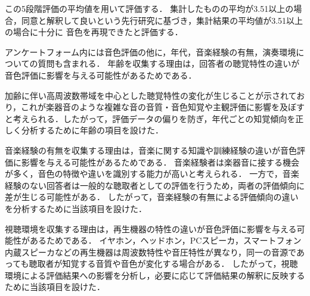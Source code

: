 \documentclass[lualatex,book,openany,paper=a4paper,jafontsize=11.5pt,jafontscale=1.05]{jlreq}
\begin{document}
この5段階評価の平均値を用いて評価する．
集計したものの平均が3.51以上の場合，同意と解釈して良いという先行研究\cite{アンケート}に基づき，集計結果の平均値が3.51以上の場合に十分に
音色を再現できたと評価する．

アンケートフォーム内には音色評価の他に，年代，音楽経験の有無，演奏環境についての質問も含まれる．
年齢を収集する理由は，回答者の聴覚特性の違いが音色評価に影響を与える可能性があるためである．


加齢に伴い高周波数帯域を中心とした聴覚特性の変化が生じることが示されており\cite{年齢}，これが楽器音のような複雑な音の音質・音色知覚や主観評価に影響を及ぼすと考えられる．したがって，評価データの偏りを防ぎ，年代ごとの知覚傾向を正しく分析するために年齢の項目を設けた．


音楽経験の有無を収集する理由は，音楽に関する知識や訓練経験の違いが音色評価に影響を与える可能性があるためである．
音楽経験者は楽器音に接する機会が多く，音色の特徴や違いを識別する能力が高いと考えられる．
一方で，音楽経験のない回答者は一般的な聴取者としての評価を行うため，両者の評価傾向に差が生じる可能性がある．
したがって，音楽経験の有無による評価傾向の違いを分析するために当該項目を設けた．


視聴環境を収集する理由は，再生機器の特性の違いが音色評価に影響を与える可能性があるためである．
イヤホン，ヘッドホン，PCスピーカ，スマートフォン内蔵スピーカなどの再生機器は周波数特性や音圧特性が異なり，同一の音源であっても聴取者が知覚する音質や音色が変化する場合がある．
したがって，視聴環境による評価結果への影響を分析し，必要に応じて評価結果の解釈に反映するために当該項目を設けた．
\end{document}
